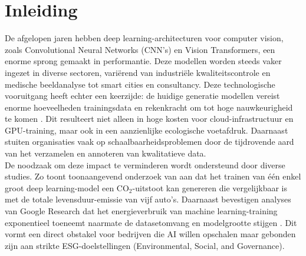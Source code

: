 


% 

\section{Inleiding}%
\label{sec:inleiding}
De afgelopen jaren hebben deep learning-\newline architecturen voor computer vision, zoals Convolutional Neural Networks (CNN’s) en Vision Transformers, een enorme sprong gemaakt in performantie. Deze modellen worden steeds vaker ingezet in diverse sectoren, variërend van industriële kwaliteitscontrole en medische beeldanalyse tot smart cities en consultancy. Deze technologische vooruitgang heeft echter een keerzijde: de huidige generatie modellen vereist enorme hoeveelheden trainingsdata en rekenkracht om tot hoge nauwkeurigheid te komen \autocite{kaplan2020scaling}. Dit resulteert niet alleen in hoge kosten voor cloud-infrastructuur en GPU-training, maar ook in een aanzienlijke ecologische voetafdruk. Daarnaast stuiten organisaties vaak op schaalbaarheidsproblemen door de tijdrovende aard van het verzamelen en annoteren van kwalitatieve data.\\

De noodzaak om deze impact te verminderen wordt ondersteund door diverse studies. Zo toont toonaangevend onderzoek van \textcite{strubell2019energy} aan dat het trainen van één enkel groot deep learning-model een CO$_2$-uitstoot kan genereren die vergelijkbaar is met de totale levensduur-emissie van vijf auto’s. Daarnaast bevestigen analyses van Google Research dat het energieverbruik van machine learning-training exponentieel toeneemt naarmate de datasetomvang en modelgrootte stijgen \autocite{patterson2021carbon}. Dit vormt een direct obstakel voor bedrijven die AI willen opschalen maar gebonden zijn aan strikte ESG-doelstellingen (Environmental, Social, and  \newline Governance).\\

